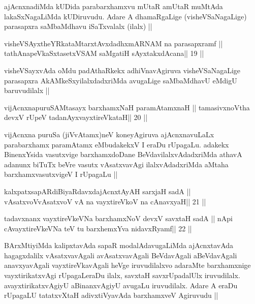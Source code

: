 \begin{artha}
ajAcnxnadiMda kUDida parabarxhamxvu mUtaR amUtaR muMtAda
lakaSxNagaLiMda kUDiruvudu. Adare A dhamaRgaLige (visheVSaNagaLige)
parasapxra saMbaMdhavu iSaTxvalalx (ilalx) || 
\end{artha}



\begin{shl}
visheVSAyxtheYRkataMtarxtAvxdadhxmARNAM na parasapxramf ||
tathA\s napeVkaSxtasetxVSAM saMgatiH sAyxtakxdAcana\hfill || 19 ||
\end{shl}

\begin{artha}
visheVSayxvAda oMdu padAthaRkekx adhiVnavAgiruva visheVSaNagaLige
parasapxra AkAMkeSxyilalxdadxriMda avugaLige saMbaMdhavU eMdigU
baruvudilalx ||
\end{artha}

\begin{shl}
vijAcnxnapuruSAMtasayx barxhamxNaH paramAtamxnaH ||
tamasivxnoV\s tha devxV rUpeV tadanAyxvayxtireVkataH\hfill || 20 ||
\end{shl}

\begin{artha}
vijAcnxna puruSa (jiVvAtamx)neV koneyAgiruva ajAcnxnavuLaLx
parabarxhamx paramAtamx eMbudakekxV I eraDu rUpagaLu.
adakekx BinenxYsida vasutxvige barxhamxdoDane BeVdavilalxvAdadxriMda
athavA adanunx biTuTx beVre vasutx vAsatxvavAgi ilalxvAdadxriMda
aMtaha barxhamxvasutxvigeV I rUpagaLu ||
\end{artha}



\begin{shl}
kalxpatxsapARdiBiyaRdavxdajAcnxtAyAH sarxjaH sadA ||
vAsatxvoV\s vAsatxvoV vA na vayxtireVkoV na cAnavxyaH\hfill || 21 ||
\end{shl}

\begin{shl}
tadavxnanx vayxtireVkeVNa barxhamxNoV devxV savxtaH sadA ||
nApi cAvayxtireVkeVNa teV tu barxhemxYva nidavxRyamf\hfill || 22 ||
\end{shl}

\begin{artha}
BArxMtiyiMda kalipxtavAda sapaR modalAdavugaLiMda ajAcnxtavAda
hagagxdalilx vAsatxvavAgali avAsatxvavAgali BeVdavAgali aBeVdavAgali
anavxyavAgali vayxtireVkavAgali heVge iruvudilalxvo adaraMte
barxhamxnige vayxtirikatxvAgi rUpagaLeraDu ilalx, savxtaH savxrUpadalUlx
iruvudilalx. avayxtirikatxvAgiyU aBinanxvAgiyU avugaLu iruvudilalx.
Adare A eraDu rUpagaLU tatatxvXtaH adivxtiVyavAda barxhamxveV Agiruvudu
||
\end{artha}


